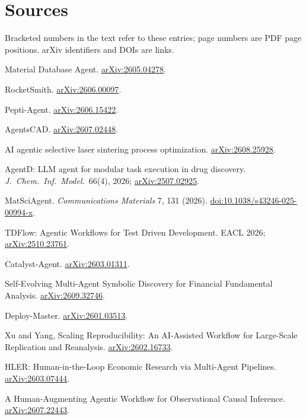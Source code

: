 \documentclass[10pt]{article}
\begin{document}
\section*{Sources}
Bracketed numbers in the text refer to these entries; page numbers are PDF page positions. arXiv identifiers and DOIs are links.
{\small
\begin{enumerate}[label={[\arabic*]},leftmargin=2.2em]
\item Material Database Agent. \href{https://arxiv.org/abs/2605.04278}{arXiv:2605.04278}.
\item RocketSmith. \href{https://arxiv.org/abs/2606.00097}{arXiv:2606.00097}.
\item Pepti-Agent. \href{https://arxiv.org/abs/2606.15422}{arXiv:2606.15422}.
\item AgentsCAD. \href{https://arxiv.org/abs/2607.02448}{arXiv:2607.02448}.
\item AI agentic selective laser sintering process optimization. \href{https://arxiv.org/abs/2608.25928}{arXiv:2608.25928}.
\item AgentD: LLM agent for modular task execution in drug discovery. \emph{J.\ Chem.\ Inf.\ Model.}\ 66(4), 2026; \href{https://arxiv.org/abs/2507.02925}{arXiv:2507.02925}.
\item MatSciAgent. \emph{Communications Materials} 7, 131 (2026). \href{https://doi.org/10.1038/s43246-025-00994-x}{doi:10.1038/s43246-025-00994-x}.
\item TDFlow: Agentic Workflows for Test Driven Development. EACL 2026; \href{https://arxiv.org/abs/2510.23761}{arXiv:2510.23761}.
\item Catalyst-Agent. \href{https://arxiv.org/abs/2603.01311}{arXiv:2603.01311}.
\item Self-Evolving Multi-Agent Symbolic Discovery for Financial Fundamental Analysis. \href{https://arxiv.org/abs/2609.32746}{arXiv:2609.32746}.
\item Deploy-Master. \href{https://arxiv.org/abs/2601.03513}{arXiv:2601.03513}.
\item Xu and Yang, Scaling Reproducibility: An AI-Assisted Workflow for Large-Scale Replication and Reanalysis. \href{https://arxiv.org/abs/2602.16733}{arXiv:2602.16733}.
\item HLER: Human-in-the-Loop Economic Research via Multi-Agent Pipelines. \href{https://arxiv.org/abs/2603.07444}{arXiv:2603.07444}.
\item A Human-Augmenting Agentic Workflow for Observational Causal Inference. \href{https://arxiv.org/abs/2607.22443}{arXiv:2607.22443}.

\end{enumerate}}
\end{document}

